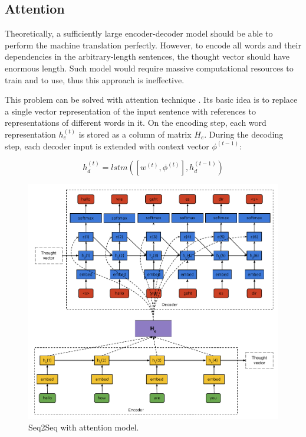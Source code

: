 \subsection{Attention} \label{attention}
Theoretically, a sufficiently large encoder-decoder model should be able to perform the machine translation perfectly. However, to encode all words and  their dependencies in the arbitrary-length sentences, the thought vector should have enormous length. Such model would require massive computational resources to train and to use,  thus this approach is ineffective.

This problem can be solved with attention technique \parencite{Bahdanau2014}. Its basic idea is to replace a single vector representation of the  input sentence with references to representations of different words in it. On the encoding step, each word representation $h_e^{(t)}$ is stored as a column of matrix $H_e$. During the decoding step, each decoder input is extended with context vector $\phi^{(t-1)}$:

\begin{equation}
h_d^{(t)} = lstm([w^{(t)}, \phi^{(t)}], h_d^{(t-1)})
\label{attn:hd}
\end{equation}

\begin{figure}
\centering
\includegraphics[width=5in]{Figures/seq2seq.pdf}
\decoRule
\caption[Seq2Seq model]{Seq2Seq with attention model.}
\label{fig:seq2seq}
\end{figure}

